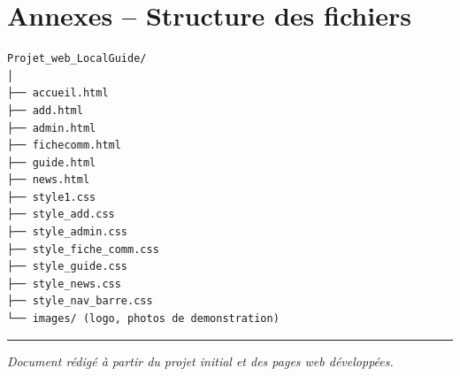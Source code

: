 \documentclass[a4paper,12pt]{article}
\begin{document}
\section{Annexes – Structure des fichiers}
\begin{lstlisting}
Projet_web_LocalGuide/
│
├── accueil.html
├── add.html
├── admin.html
├── fichecomm.html
├── guide.html
├── news.html
├── style1.css
├── style_add.css
├── style_admin.css
├── style_fiche_comm.css
├── style_guide.css
├── style_news.css
├── style_nav_barre.css
└── images/ (logo, photos de demonstration)
\end{lstlisting}

\vfill
\hrule
\centering
\textit{Document rédigé à partir du projet initial et des pages web développées.}
\end{document}
